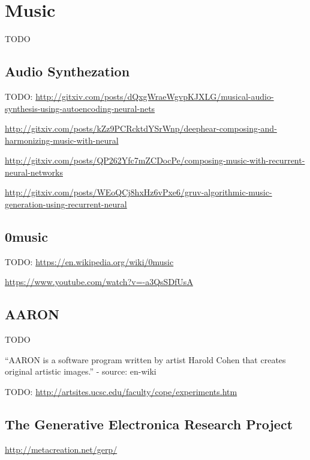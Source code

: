 
\section{Music}
\label{sec:music}
TODO \cite{nayebigruv}

\subsection{Audio Synthezation}
TODO: \href{http://gitxiv.com/posts/dQxgWraeWgvpKJXLG/musical-audio-synthesis-using-autoencoding-neural-nets}{http://gitxiv.com/posts/dQxgWraeWgvpKJXLG/musical-audio-synthesis-using-autoencoding-neural-nets}

\href{http://gitxiv.com/posts/kZz9PCRcktdYSrWnp/deephear-composing-and-harmonizing-music-with-neural}{http://gitxiv.com/posts/kZz9PCRcktdYSrWnp/deephear-composing-and-harmonizing-music-with-neural}

\href{http://gitxiv.com/posts/QP262Yfc7mZCDocPe/composing-music-with-recurrent-neural-networks}{http://gitxiv.com/posts/QP262Yfc7mZCDocPe/composing-music-with-recurrent-neural-networks}

\href{http://gitxiv.com/posts/WEoQCj8hxHz6vPxe6/gruv-algorithmic-music-generation-using-recurrent-neural}{http://gitxiv.com/posts/WEoQCj8hxHz6vPxe6/gruv-algorithmic-music-generation-using-recurrent-neural}

\subsection{0music}
TODO: \href{https://en.wikipedia.org/wiki/0music}{https://en.wikipedia.org/wiki/0music}

\href{https://www.youtube.com/watch?v=-a3QsSDfUsA}{https://www.youtube.com/watch?v=-a3QsSDfUsA}


\subsection{AARON}

TODO

\enquote{AARON is a software program written by artist Harold Cohen that creates original artistic images.} - source: en-wiki

TODO: \href{http://artsites.ucsc.edu/faculty/cope/experiments.htm}{http://artsites.ucsc.edu/faculty/cope/experiments.htm}


\subsection{The Generative Electronica Research Project}

\href{http://metacreation.net/gerp/}{http://metacreation.net/gerp/}
